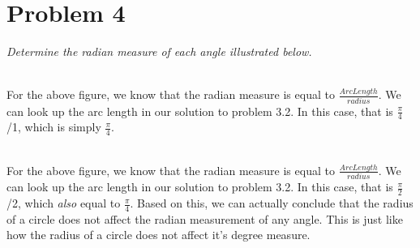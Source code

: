 \documentclass[11pt]{article} %
\begin{document}
\section{Problem 4}
\textit{Determine the radian measure of each angle illustrated below.} \\
\\
For the above figure, we know that the radian measure is equal to $\frac{Arc Length}{radius}$. 
We can look up the arc length in our solution to problem 3.2.
In this case, that is $\frac{\pi}{4}$/1, which is simply \textbf{$\frac{\pi}{4}$}.
\\
\\
For the above figure, we know that the radian measure is equal to $\frac{Arc Length}{radius}$. 
We can look up the arc length in our solution to problem 3.2.
In this case, that is $\frac{\pi}{2}$/2, which \textit{also} equal to \textbf{$\frac{\pi}{4}$}.
Based on this, we can actually conclude that the radius of a circle does not affect the radian measurement of any angle. 
This is just like how the radius of a circle does not affect it's degree measure.
\end{document}

